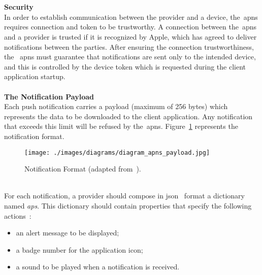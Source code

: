 \\
\\
\textbf{Security}\\
In order to establish communication between the provider and a device, the~\gls{apns} requires connection and token to be trustworthy. A connection between the~\gls{apns} and a provider is trusted if it is recognized by Apple, which has agreed to deliver notifications between the parties. After ensuring the connection trustworthiness, the ~\gls{apns} must guarantee that notifications are sent only to the intended device, and this is controlled by the device token which is requested during the client application startup. \\
\\
\textbf{The Notification Payload}\\
Each push notification carries a payload (maximum of 256 bytes) which represents the data to be downloaded to the client application. Any notification that exceeds this limit will be refused by the~\gls{apns}. Figure~\ref{fig:apnsPayload} represents the notification format.\\
\begin{figure}[h!]
 \centering
   \texttt{[image: ./images/diagrams/diagram\_apns\_payload.jpg]}
   \caption{Notification Format (adapted from~\cite{apnsDetailed}).}
   \label{fig:apnsPayload}
\end{figure}
\\
For each notification, a provider should compose in \gls{json}~\cite{json} format a dictionary named \emph{aps}. This dictionary should contain properties that specify the following actions~\cite{apns}: 

\begin{itemize}
\item an alert message to be displayed;
\item a badge number for the application icon;
\item a sound to be played when a notification is received.
\end{itemize}


